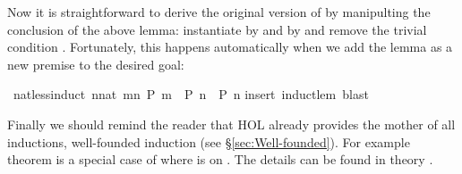 \begin{isabellebody}
\begin{isamarkuptext}
Now it is straightforward to derive the original version of
 by manipulting the conclusion of the above lemma:
instantiate  by  and  by  and
remove the trivial condition . Fortunately, this
happens automatically when we add the lemma as a new premise to the
desired goal:%
\end{isamarkuptext}%
\ nat{\isacharunderscore}less{\isacharunderscore}induct{\isacharcolon}\ {\isachardoublequote}{\isacharparenleft}{\isasymAnd}n{\isacharcolon}{\isacharcolon}nat{\isachardot}\ {\isasymforall}m{\isacharless}n{\isachardot}\ P\ m\ {\isasymLongrightarrow}\ P\ n{\isacharparenright}\ {\isasymLongrightarrow}\ P\ n{\isachardoublequote}\isanewline
{}insert\ induct{\isacharunderscore}lem{\isacharcomma}\ blast{\isacharparenright}%
\begin{isamarkuptext}%
Finally we should remind the reader that HOL already provides the mother of
all inductions, well-founded induction (see \S\ref{sec:Well-founded}).  For
example theorem  is
a special case of  where  is \isa{{\isacharless}} on
. The details can be found in theory .%
\end{isamarkuptext}%
\end{isabellebody}%
